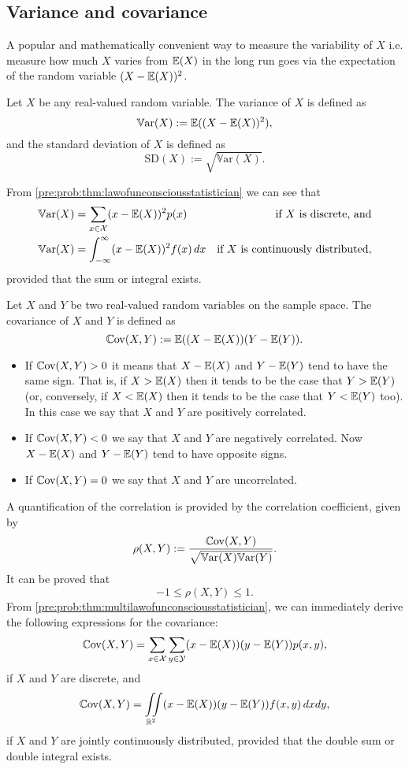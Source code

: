 \documentclass[10pt, a4paper]{article}
\begin{document}
\subsection{Variance and covariance}
A popular and mathematically convenient way to measure the variability of $X$ i.e. measure how much $X$ varies from $\mathbb{E}(X)$ in the long run goes via the expectation of the random variable $(X - \mathbb{E}(X)) ^ 2$.

\begin{definition}
    Let $X$ be any real-valued random variable.
    The variance of $X$ is defined as
    \[
    \mathbb{V}\mathrm{ar}(X) := \mathbb{E}((X - \mathbb{E}(X)) ^ 2),
    \]
    and the standard deviation of $X$ is defined as
    \[
    \mathrm{SD}(X) := \sqrt{\mathbb{V}\mathrm{ar}(X)}.
    \]
\end{definition}

From \autoref{pre:prob:thm:lawofunconsciousstatistician} we can see that
\begin{align*}
    \mathbb{V}\mathrm{ar}(X) &= \sum_{x \in \mathcal{X}}(x - \mathbb{E}(X)) ^ 2p(x)&\text{if $X$ is discrete, and} \\
    \mathbb{V}\mathrm{ar}(X) &= \int_{-\infty}^{\infty}(x - \mathbb{E}(X)) ^ 2f(x)\,dx&\text{if $X$ is continuously distributed},
\end{align*}
provided that the sum or integral exists.

\begin{definition}[Covariance]
    Let $X$ and $Y$ be two real-valued random variables on the sample space.
    The covariance of $X$ and $Y$ is defined as
    \[
    \mathbb{C}\mathrm{ov}{(X, Y)} := \mathbb{E}((X - \mathbb{E}(X))(Y - \mathbb{E}(Y)).
    \]
\end{definition}
\begin{itemize}
    \item If $\mathbb{C}\mathrm{ov}(X, Y) > 0$ it means that $X - \mathbb{E}(X)$ and $Y - \mathbb{E}(Y)$ tend to have the same sign.
    That is,
    if $X > \mathbb{E}(X)$ then it tends to be the case that $Y > \mathbb{E}(Y)$
    (or, conversely,
    if $X < \mathbb{E}(X)$ then it tends to be the case that $Y < \mathbb{E}(Y)$ too).
    In this case we say that $X$ and $Y$ are positively correlated.
    \item If $\mathbb{C}\mathrm{ov}(X, Y) < 0$ we say that $X$ and $Y$ are negatively correlated.
    Now $X - \mathbb{E}(X)$ and $Y - \mathbb{E}(Y)$ tend to have opposite signs.
    \item If $\mathbb{C}\mathrm{ov}(X, Y) = 0$ we say that $X$ and $Y$ are uncorrelated.
\end{itemize}

A quantification of the correlation is provided by the correlation coefficient,
given by
\[
\rho(X, Y) := \frac{\mathbb{C}\mathrm{ov}(X, Y)}{\sqrt{\mathbb{V}\mathrm{ar}(X)\mathbb{V}\mathrm{ar}(Y)}}.
\]
It can be proved that
\[
-1 \leq \rho(X, Y) \leq 1.
\]
From \autoref{pre:prob:thm:multilawofunconsciousstatistician},
we can immediately derive the following expressions for the covariance:
\[
\mathbb{C}\mathrm{ov}(X, Y) = \sum_{x \in \mathcal{X}}\sum_{y \in \mathcal{Y}}(x - \mathbb{E}(X))(y - \mathbb{E}(Y))p(x, y),
\]
if $X$ and $Y$ are discrete,
and
\[
\mathbb{C}\mathrm{ov}(X, Y) = \iint\limits_{\mathbb{R} ^ 2}(x - \mathbb{E}(X))(y - \mathbb{E}(Y))f(x, y)\,dxdy,
\]
if $X$ and $Y$ are jointly continuously distributed,
provided that the double sum or double integral exists.
\end{document}
